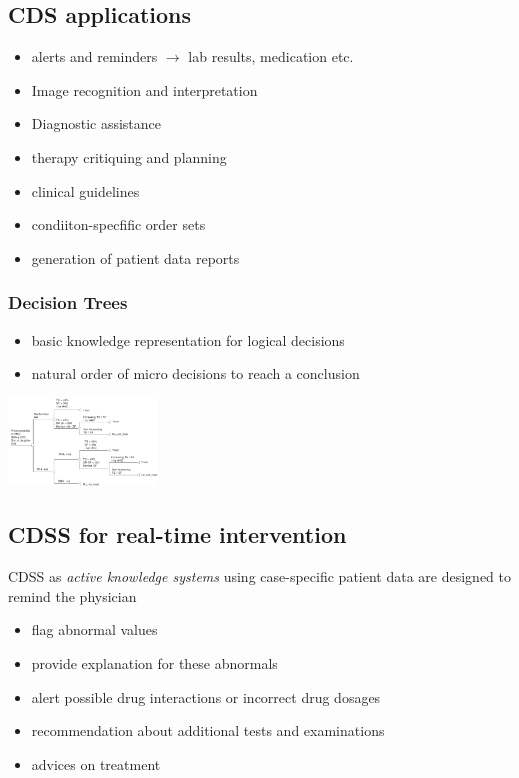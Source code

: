 \documentclass{report}
\newenvironment{Figure}
	{\par\medskip\noindent\minipage{\linewidth}}
	{\endminipage\par\medskip}
\theoremstyle{definition}
\theoremstyle{example}
\begin{document}
\subsection{CDS applications}
\begin{itemize}
   \item alerts and reminders $\rightarrow$ lab results, medication etc.
   \item Image recognition and interpretation
   \item Diagnostic assistance
   \item therapy critiquing and planning
   \item clinical guidelines
   \item condiiton-specfific order sets
   \item generation of patient data reports
\end{itemize}

\subsubsection{Decision Trees}
\begin{itemize}
   \item basic knowledge representation for logical decisions
   \item natural order of micro decisions to reach a conclusion
\end{itemize}

\begin{Figure}
   \centering
    \includegraphics[width=150px]{img/DecisionTree.png}
        \label{fig:example decision tree}
\end{Figure}

\subsection{CDSS for real-time intervention}
CDSS as \textit{active knowledge systems} using case-specific patient data are designed to remind the physician
\begin{itemize}
   \item flag abnormal values
   \item provide explanation for these abnormals
   \item alert possible drug interactions or incorrect drug dosages
   \item recommendation about additional tests and examinations
   \item advices on treatment
\end{itemize}
\end{document}

